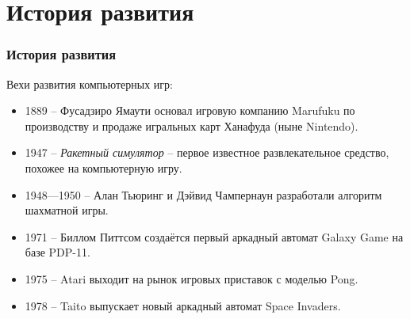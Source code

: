 \section{История развития}
\begin{frame}
    \frametitle{История развития}
    Вехи развития компьютерных игр:
    \begin{itemize}
        \item 1889 -- Фусадзиро Ямаути основал игровую компанию Marufuku по производству и 
            продаже игральных карт Ханафуда (ныне Nintendo).
        \item 1947 -- \emph{Ракетный симулятор} -- первое известное развлекательное средство, похожее на 
            компьютерную игру.
        \item 1948—1950 -- Алан Тьюринг и Дэйвид Чампернаун разработали алгоритм шахматной игры. 
        \item 1971 -- Биллом Питтсом создаётся первый аркадный автомат Galaxy Game на 
            базе PDP-11.
        \item 1975 -- Atari выходит на рынок игровых приставок с моделью Pong.
        \item 1978 -- Taito выпускает новый аркадный автомат Space Invaders.
    \end{itemize}
\end{frame}

